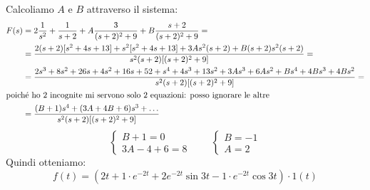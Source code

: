 \smallskip
Calcoliamo $ A $ e $ B $ attraverso il sistema:
\begin{align*}
	F(s) &= 2 \frac{1}{s^2} + \frac{1}{s+2} + A \frac{3}{(s+2)^2+9} + B \frac{s+2}{(s+2)^2+9} =\\
	&= \frac{2(s+2)[s^2+4s+13] + s^2[s^2+4s+13] + 3As^2(s+2) + B(s+2)s^2(s+2)}{s^2(s+2)[(s+2)^2+9]} =\\
	&= \frac{2s^3+8s^2+26s+4s^2+16s+52+s^4+4s^3+13s^2+3As^3+6As^2+Bs^4+4Bs^3+4Bs^2}{s^2(s+2)[(s+2)^2+9]} =\\
	\intertext{poich\'{e} ho 2 incognite mi servono solo 2 equazioni: posso ignorare le altre}
	&= \frac{(B+1)s^4 + (3A+4B+6)s^3 + \dots}{s^2(s+2)[(s+2)^2+9]}
\end{align*}
\[ \begin{cases}B+1=0\\ 3A-4+6=8\end{cases} \qquad 
\begin{cases}B=-1\\ A=2\end{cases}								
\]
Quindi otteniamo:
\[ f(t) = (2t + 1 \cdot e^{-2t} + 2e^{-2t}\sin3t - 1 \cdot e^{-2t} \cos3t) \cdot 1(t) \]
%
%
